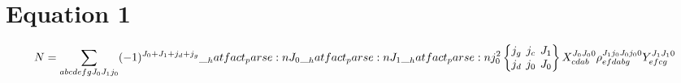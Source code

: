 \documentclass{scrartcl}
\newcommand{\sixj}[6]{\begingroup\setlength{\arraycolsep}{0.2em}\begin{Bmatrix} #1 & #2 & #3 \\ #4 & #5 & #6 \end{Bmatrix}\endgroup}
\begin{document}
\section{Equation 1}
\begin{dmath*}
N = \sum_{a b c d e f g {J}_{0} {J}_{1} {j}_{0}} \* (-1)^{{J}_{0}+{J}_{1}+{j}_{d}+{j}_{g}} \* \hatfact{{J}_{0}} \* \hatfact{{J}_{1}} \* \hatfact{{j}_{0}^{2}} \* \sixj{{j}_{g}}{{j}_{c}}{{J}_{1}}{{j}_{d}}{{j}_{0}}{{J}_{0}} \* X_{c d a b}^{{J}_{0} {J}_{0} 0} \* \rho_{e f d a b g}^{{J}_{1} {j}_{0} {J}_{0} {j}_{0} 0} \* Y_{e f c g}^{{J}_{1} {J}_{1} 0}
\end{dmath*}
\end{document}
